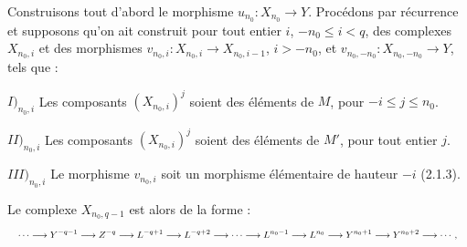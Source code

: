 Construisons tout d'abord le morphisme
$u_{n_0}\colon X_{n_0}\longrightarrow Y$. Procédons par récurrence et
supposons qu'on ait construit pour tout entier $i$, $-n_0\leq i<q$, des
complexes $X_{n_0,i}$ et des morphismes
$v_{n_0,i}\colon X_{n_0,i}\longrightarrow X_{n_0,i-1}$, $i>-n_0$, et
$v_{n_0,-n_0}\colon X_{n_0,-n_0}\longrightarrow Y$, tels que :

\noindent $I)_{n_0,i}$ Les composants $(X_{n_0,i})^j$ soient des éléments de
$M$, pour $-i\leq j\leq n_0$.

\noindent $II)_{n_0,i}$ Les composants $(X_{n_0,i})^j$ soient des éléments
de $M'$, pour tout entier $j$.

\noindent $III)_{n_0,i}$ Le morphisme $v_{n_0,i}$ soit un morphisme
élémentaire de hauteur $-i$ (2.1.3).

Le complexe $X_{n_0,q-1}$ est alors de la forme :
\[
\resizebox{\textwidth}{!}{$\displaystyle
\cdots\longrightarrow Y^{-q-1}\longrightarrow Z^{-q}
\longrightarrow L^{-q+1}\longrightarrow L^{-q+2}\longrightarrow\cdots
\longrightarrow L^{n_0-1}\longrightarrow L^{n_0}
\longrightarrow Y^{n_0+1}\longrightarrow Y^{n_0+2}\longrightarrow\cdots,
$}
\]
\endgroup
